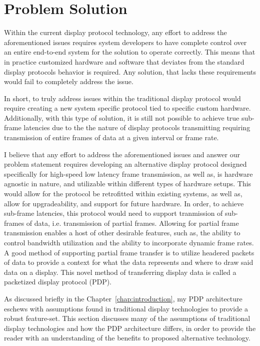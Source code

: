 \section{Problem Solution}
Within the current display protocol technology, any effort to address the aforementioned issues requires system developers to have complete control over an entire end-to-end system for the solution to operate correctly. This means that in practice customized hardware and software that deviates from the standard display protocols behavior is required. Any solution, that lacks these requirements would fail to completely address the issue.

In short, to truly address issues within the traditional display protocol would require creating a new system specific protocol tied to specific custom hardware. Additionally, with this type of solution, it is still not possible to achieve true sub-frame latencies due to the the nature of display protocols transmitting requiring transmission of entire frames of data at a given interval or frame rate.

I believe that any effort to address the aforementioned issues and answer our problem statement requires developing an alternative display protocol designed specifically for high-speed low latency frame transmission, as well as, is hardware agnostic in nature, and utilizable within different types of hardware setups. This would allow for the protocol be retrofitted within existing systems, as well as, allow for upgradeability, and support for future hardware. In order, to achieve sub-frame latencies, this protocol would need to support tranmission of sub-frames of data, i.e. transmission of partial frames. Allowing for partial frame transmission enables a host of other desirable features, such as, the ability to control bandwidth utilization and the ability to incorporate dynamic frame rates. A good method of supporting partial frame transfer is to utilize headered packets of data to provide a context for what the data represents and where to draw said data on a display. This novel method of transferring display data is called a packetized display protocol (PDP).

As discussed briefly in the Chapter~\ref{chap:introduction}, my PDP architecture eschews with assumptions found in traditional display technologies to provide a robust feature-set. This section discusses many of the assumptions of traditional display technologies and how the PDP architecture differs, in order to provide the reader with an understanding of the benefits to proposed alternative technology.

